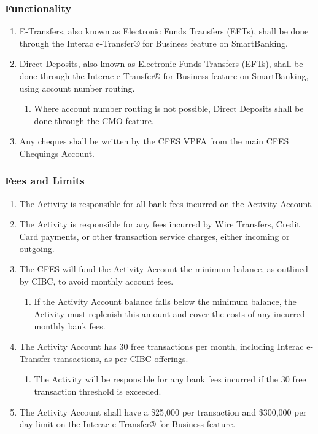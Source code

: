 \subsubsection{Functionality}
\label{functionality}

\begin{enumerate}
 \item
  E-Transfers, also known as Electronic Funds Transfers (EFTs), shall be done through the Interac e-Transfer® for Business feature on SmartBanking.
 \item
  Direct Deposits, also known as Electronic Funds Transfers (EFTs), shall be done through the Interac e-Transfer® for Business feature on SmartBanking, using account number routing.

  \begin{enumerate}
   \item
    Where account number routing is not possible, Direct Deposits shall be done through the CMO feature.
  \end{enumerate}
 \item
  Any cheques shall be written by the CFES VPFA from the main CFES Chequings Account.
\end{enumerate}

\subsubsection{Fees and Limits}
\label{fees-and-limits}

\begin{enumerate}
 \item
  The Activity is responsible for all bank fees incurred on the Activity Account.
 \item
  The Activity is responsible for any fees incurred by Wire Transfers, Credit Card payments, or other transaction service charges, either incoming or outgoing.
 \item
  The CFES will fund the Activity Account the minimum balance, as outlined by CIBC, to avoid monthly account fees.

  \begin{enumerate}
   \item
    If the Activity Account balance falls below the minimum balance, the Activity must replenish this amount and cover the costs of any incurred monthly bank fees.
  \end{enumerate}
 \item
  The Activity Account has 30 free transactions per month, including Interac e-Transfer transactions, as per CIBC offerings.

  \begin{enumerate}
   \item
    The Activity will be responsible for any bank fees incurred if the 30 free transaction threshold is exceeded.
  \end{enumerate}
 \item
  The Activity Account shall have a \$25,000 per transaction and \$300,000 per day limit on the Interac e-Transfer® for Business feature.
\end{enumerate}

